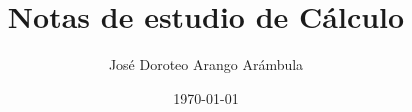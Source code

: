 \documentclass[10pt,oneside]{article}
\author{José Doroteo Arango Arámbula} %
\title{Notas de estudio de Cálculo}
\date{\today}
\begin{document}
\maketitle
\tableofcontents



\nocite{Ross2012}
\printbibliography
\end{document}
